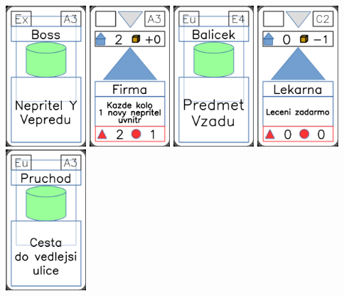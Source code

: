 \documentclass[a4paper]{article}
\begin{document}
	\includegraphics[width=3.0cm]{img-4_2}
	\includegraphics[width=3.0cm]{img-3_17}
	\includegraphics[width=3.0cm]{img-4_23}
	\includegraphics[width=3.0cm]{img-3_11}
	\includegraphics[width=3.0cm]{img-4_32}
\end{document}
